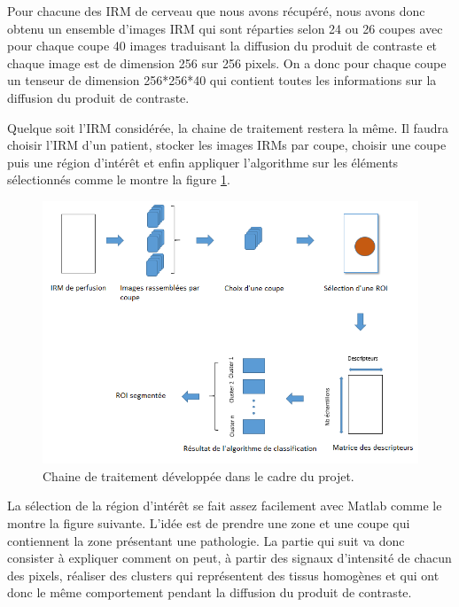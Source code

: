 Pour chacune des IRM de cerveau que nous avons récupéré, nous avons donc obtenu un ensemble d'images IRM qui sont réparties selon 24 ou 26 coupes avec pour chaque coupe 40 images traduisant la diffusion du produit de contraste et chaque image est de dimension 256 sur 256 pixels. On a donc pour chaque coupe un tenseur de dimension 256*256*40 qui contient toutes les informations sur la diffusion du produit de contraste.

\medskip

Quelque soit l'IRM considérée, la chaine de traitement restera la même. Il faudra choisir l'IRM d'un patient, stocker les images IRMs par coupe, choisir une coupe puis une région d'intérêt et enfin appliquer l'algorithme sur les éléments sélectionnés comme le montre la figure \ref{fig:toolchain}.


\begin{figure}[H]
\centering
    \includegraphics[scale=0.8,angle=0]{Images/Processing_toolchain.png}
    \caption{Chaine de traitement développée dans le cadre du projet.}
    \label{fig:toolchain}
\end{figure}


La sélection de la région d'intérêt se fait assez facilement avec Matlab comme le montre la figure suivante. L'idée est de prendre une zone et une coupe qui contiennent la zone présentant une pathologie. La partie qui suit va donc consister à expliquer comment on peut, à partir des signaux d'intensité de chacun des pixels, réaliser des clusters qui représentent des tissus homogènes et qui ont donc le même comportement pendant la diffusion du produit de contraste.

